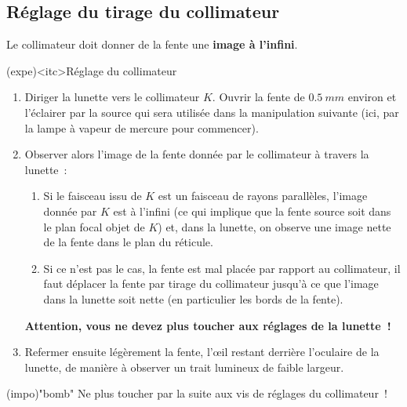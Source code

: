 \documentclass[../main/main.tex]{subfiles}
\begin{document}
{\begin{tcb}
\end{tcb}

\subsection{Réglage du tirage du collimateur}

Le collimateur doit donner de la fente une \textbf{image à l'infini}.
\begin{tcb}(expe)<itc>{Réglage du collimateur}
  \begin{enumerate}
    \item Diriger la lunette vers le collimateur $K$. Ouvrir la fente de
      $\SI{0,5}{mm}$ environ et l'éclairer par la source qui sera utilisée dans
      la manipulation suivante (ici, par la lampe à vapeur de mercure pour
      commencer).
    \item Observer alors l'image de la fente donnée par le collimateur à travers
      la lunette~:
    \begin{enumerate}
      \item Si le faisceau issu de $K$ est un faisceau de rayons parallèles,
    l'image donnée par $K$ est à l'infini (ce qui implique que la fente source
    soit dans le plan focal objet de $K$) et, dans la lunette, on observe une
    image nette de la fente dans le plan du réticule.
      \item Si ce n'est pas le cas, la fente est mal
    placée par rapport au collimateur, il faut déplacer la fente par tirage du
    collimateur jusqu'à ce que l'image dans la lunette soit nette (en
    particulier les bords de la fente).
    \end{enumerate}
    \begin{center}
      \bfseries
      Attention, vous ne devez plus toucher aux réglages de la lunette~! 
    \end{center}
    \item Refermer ensuite légèrement la fente, l'œil restant derrière l'oculaire
      de la lunette, de manière à observer un trait lumineux de faible largeur.
  \end{enumerate}

  \begin{center}
      \begin{tcb}[bld, cnt, width=.9\linewidth](impo)"bomb"{}
      Ne plus toucher par la suite aux vis de réglages du collimateur~!
    \end{tcb}
  \end{center}


\end{tcb}}
\end{document}
